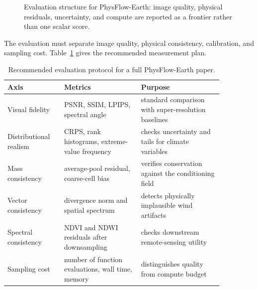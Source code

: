 \documentclass{article}
\begin{document}
\begin{figure}[t]
\centering
{}
\caption{Evaluation structure for PhysFlow-Earth: image quality, physical residuals, uncertainty, and compute are reported as a frontier rather than one scalar score.}
\label{fig:physflow-eval}
\end{figure}

The evaluation must separate image quality, physical consistency, calibration, and sampling cost. Table~\ref{tab:protocol} gives the recommended measurement plan.

\begin{table}[t]
\centering
\caption{Recommended evaluation protocol for a full PhysFlow-Earth paper.}
\label{tab:protocol}
\begin{tabular}{@{}p{0.22\linewidth}p{0.31\linewidth}p{0.33\linewidth}@{}}
\toprule
\textbf{Axis} & \textbf{Metrics} & \textbf{Purpose}\\
\midrule
Visual fidelity & PSNR, SSIM, LPIPS, spectral angle & standard comparison with super-resolution baselines\\
Distributional realism & CRPS, rank histograms, extreme-value frequency & checks uncertainty and tails for climate variables\\
Mass consistency & average-pool residual, coarse-cell bias & verifies conservation against the conditioning field\\
Vector consistency & divergence norm and spatial spectrum & detects physically implausible wind artifacts\\
Spectral consistency & NDVI and NDWI residuals after downsampling & checks downstream remote-sensing utility\\
Sampling cost & number of function evaluations, wall time, memory & distinguishes quality from compute budget\\
\bottomrule
\end{tabular}
\end{table}
\end{document}
